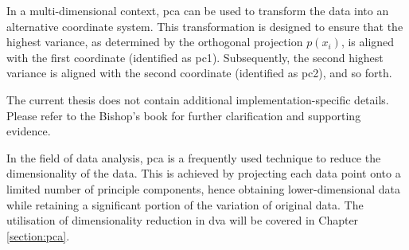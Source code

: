 In a multi-dimensional context, \gls{pca} can be used to transform the data into an alternative coordinate system. This transformation is designed to ensure that the highest variance, as determined by the orthogonal projection $p(x_i)$, is aligned with the first coordinate (identified as \gls{pc1}). Subsequently, the second highest variance is aligned with the second coordinate (identified as \gls{pc2}), and so forth.

The current thesis does not contain additional implementation-specific details. Please refer to the Bishop's book \cite{bishop2006pattern}  for further clarification and supporting evidence.

In the field of data analysis, \gls{pca} is a frequently used technique to reduce the dimensionality of the data.  This is achieved by projecting each data point onto a limited number of principle components, hence obtaining lower-dimensional data while retaining a significant portion of the variation of original data. The utilisation of dimensionality reduction in \gls{dva} will be covered in Chapter \ref{section:pca}.








